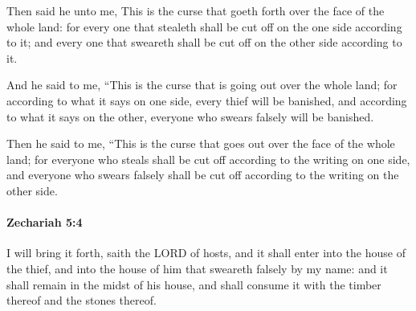 			\begin{versebox}
					\item[BHS] 
					\item[LXX] 
					\item[ASV] Then said he unto me, This is the curse that goeth forth over the face of the whole land: for every one that stealeth shall be cut off on the one side according to it; and every one that sweareth shall be cut off on the other side according to it.
					\item[NIV] And he said to me, “This is the curse that is going out over the whole land; for according to what it says on one side, every thief will be banished, and according to what it says on the other, everyone who swears falsely will be banished.
					\item[NRSV] Then he said to me, “This is the curse that goes out over the face of the whole land; for everyone who steals shall be cut off according to the writing on one side, and everyone who swears falsely shall be cut off according to the writing on the other side.
			\end{versebox}

		\paragraph{Zechariah 5:4} %
			\label{ZECHARIAH-5-4}

			I will bring it forth, saith the LORD of hosts, and it shall enter into the house of the thief, and into the house of him that sweareth falsely by my name: and it shall remain in the midst of his house, and shall consume it with the timber thereof and the stones thereof.

